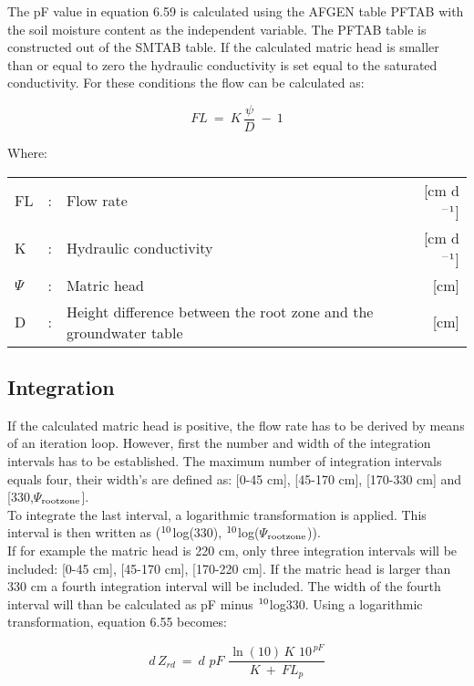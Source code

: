 The pF value in equation 6.59 is calculated using the AFGEN table PFTAB with the soil
moisture content as the independent variable. The PFTAB table is constructed out of the
SMTAB table. If the calculated matric head is smaller than or equal to zero the hydraulic
conductivity is set equal to the saturated conductivity. For these conditions the flow can
be calculated as:

\begin{equation}
FL~=~K\,{\frac{\psi }{D}} ~-~ 1
\end{equation}

Where:\\[5pt]
\begin{tabularx}{\textwidth}{llXr}
FL &:& Flow rate  & [cm d$^{{\rm -1}}$]\\
K  &:& Hydraulic conductivity  & [cm d$^{{\rm -1}}$]\\
$\Psi$ &:& Matric head  & [cm]\\
D &:& Height difference between the root zone and the groundwater table  & [cm]\\
\end{tabularx}

\subsection{Integration}
If the calculated matric head is positive, the flow rate has to be derived by means of an
iteration loop. However, first the number and width of the integration intervals has to be
established. The maximum number of integration intervals equals four, their width's are
defined as: [0-45 cm], [45-170 cm], [170-330 cm] and [330,$\Psi$$_{{\rm rootzone}}$].\\
To integrate the last interval, a logarithmic transformation is applied. This interval is then
written as ($^{{\rm 10}}$log(330), $^{{\rm 10}}$log($\Psi$$_{{\rm rootzone}}$)).\\
If for example the matric head is 220 cm, only three integration intervals will be
included: [0-45 cm], [45-170 cm], [170-220 cm]. If the matric head is larger than 330 cm
a fourth integration interval will be included. The width of the fourth interval will than be
calculated as pF minus $^{{\rm 10}}$log330. Using a logarithmic transformation, equation 6.55
becomes:

\begin{equation}
d\, Z _{rd} ~=~ d\,\, pF\,\,{\frac{\ln (10)\, K\,\, 10^{\, pF} }{K~+~FL _{p} }}
\end{equation}

